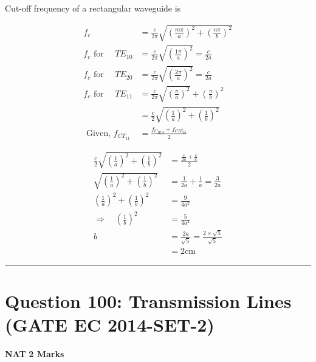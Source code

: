 \documentclass[11pt,a4paper]{article}
\begin{document}
\begin{tcolorbox}[solbox, title=Detailed Solution -- Question 99]
Cut-off frequency of a rectangular waveguide is 

\[
\begin{aligned} f_{c}&=\frac{c}{2 \pi} \sqrt{\left(\frac{m \pi}{a}\right)^{2}+\left(\frac{n\pi}{b}\right)^{2}} \\ f_{c} \text{ for }\quad T E_{10}&=\frac{c}{2 \pi} \sqrt{\left(\frac{1 \pi}{a}\right)^{2}}=\frac{c}{2 a} \\ f_{c} \text{ for }\quad T E_{20}&=\frac{c}{2 \pi} \sqrt{\left(\frac{2 \pi}{a}\right)^{2}}=\frac{c}{2 a} \\ f_{c} \text { for } \quad T E_{11} &=\frac{c}{2 \pi} \sqrt{\left(\frac{\pi}{a}\right)^{2}}+\left(\frac{\pi}{b}\right)^{2} \\ &=\frac{c}{2} \sqrt{\left(\frac{1}{a}\right)^{2}+\left(\frac{1}{b}\right)^{2}} \\ \text { Given, } f_{C T_{11}} &=\frac{f_{C_{I E 10}}+f_{C I E_{20}}}{2} \end{aligned}
\]

\[
\begin{aligned} \frac{c}{2} \sqrt{\left(\frac{1}{a}\right)^{2}+\left(\frac{1}{b}\right)^{2}}&=\frac{\frac{c}{2 a}+\frac{c}{a}}{2} \\ \sqrt{\left(\frac{1}{a}\right)^{2}+\left(\frac{1}{b}\right)^{2}}&=\frac{1}{2 a}+\frac{1}{a}=\frac{3}{2 a} \\ \left(\frac{1}{a}\right)^{2}+\left(\frac{1}{b}\right)^{2}&=\frac{9}{4 a^{2}} \\ \Rightarrow \quad\left(\frac{1}{b}\right)^{2} &=\frac{5}{4 a^{2}} \\ b &=\frac{2 a}{\sqrt{5}}=\frac{2 \times \sqrt{5}}{\sqrt{5}} \\ &=2 \mathrm{cm} \end{aligned}
\]
\end{tcolorbox}

\vspace{1.5em}
\hrule
\vspace{1.5em}

\section*{Question 100: Transmission Lines (GATE EC 2014-SET-2)}
\noindent \textbf{\color{primary}NAT} \hfill \textbf{\color{secondary}2 Marks}
\end{document}
